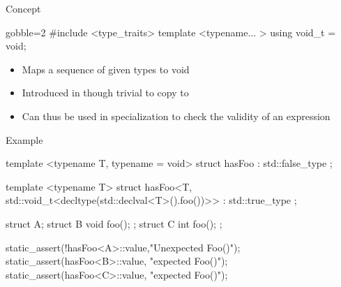 \begin{frame}[fragile]
  \begin{block}{Concept}
    \begin{cppcode*}{gobble=2}
      #include <type_traits>
      template <typename... >
      using void_t = void;
    \end{cppcode*}
    \begin{itemize}
    \item Maps a sequence of given types to void
    \item Introduced in  though trivial to copy to 
    \item Can thus be used in specialization to check the validity of an expression
    \end{itemize}
  \end{block}
\end{frame}

\begin{frame}[fragile]
    \begin{exampleblock}{Example}
      \begin{cppcode*}{}
      template <typename T, typename = void>
      struct hasFoo : std::false_type {};

      template <typename T>
      struct hasFoo<T,
         std::void_t<decltype(std::declval<T>().foo())>>
      : std::true_type {};

      struct A{}; struct B{ void foo(); };
      struct C{ int foo(); };

      static_assert(!hasFoo<A>::value,"Unexpected Foo()");
      static_assert(hasFoo<B>::value, "expected Foo()");
      static_assert(hasFoo<C>::value, "expected Foo()");
      \end{cppcode*}
    \end{exampleblock}
\end{frame}

